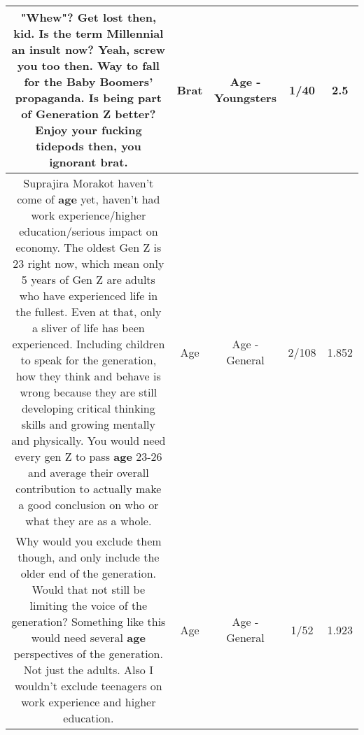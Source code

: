 \documentclass[11pt]{article}
\newlength\mylength
\begin{document}
\begin{center}
\begin{longtable}{|C{.65\mylength}|C{.30\mylength}|C{.12\mylength}|C{.12\mylength}|C{.12\mylength}|}
  \small "Whew"? Get lost then, kid. Is the term Millennial an insult now? Yeah, screw you too then. Way to fall for the Baby Boomers' propaganda. Is being part of Generation Z better? Enjoy your fucking tidepods then, you ignorant \textbf{brat}.\normalsize   & Brat & Age - Youngsters & 1/40 & 2.5 \\  \hline
  \small Suprajira Morakot haven't come of \textbf{age} yet, haven't had work experience/higher education/serious impact on economy. The oldest Gen Z is 23 right now, which mean only 5 years of Gen Z are adults who have experienced life in the fullest. Even at that, only a sliver of life has been experienced. Including children to speak for the generation, how they think and behave is wrong because they are still developing critical thinking skills and growing mentally and physically. You would need every gen Z to pass \textbf{age} 23-26 and average their overall contribution to actually make a good conclusion on who or what they are as a whole.\normalsize   & Age & Age - General & 2/108 & 1.852 \\  \hline
  \small Why would you exclude them though, and only include the older end of the generation. Would that not still be limiting the voice of the generation? Something like this would need several \textbf{age} perspectives of the generation. Not just the adults.  Also I wouldn't exclude teenagers on work experience and higher education.\normalsize   & Age & Age - General & 1/52 & 1.923 \\  \hline

\end{longtable}
\end{center}
\end{document}
